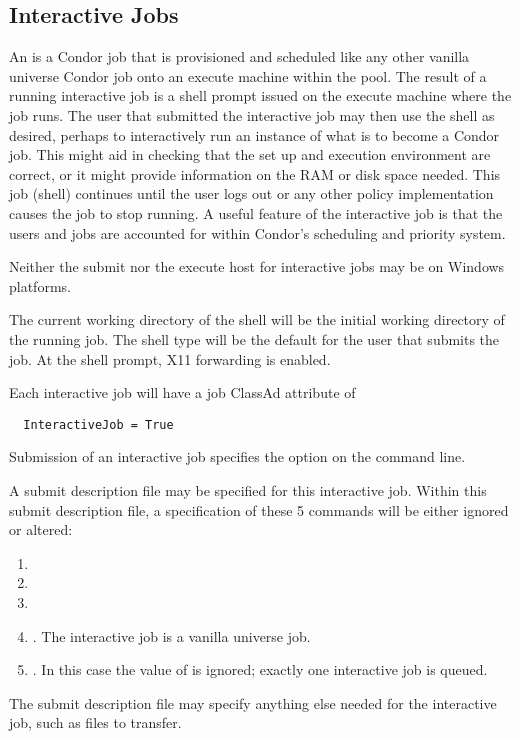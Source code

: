 \subsection{\label{sec:Submit-Interactive}Interactive Jobs}

An  is a Condor job that is provisioned and
scheduled like any other vanilla universe Condor job 
onto an execute machine within the pool.
The result of a running interactive job is a shell prompt 
issued on the execute machine where the job runs.
The user that submitted the interactive job may then use the
shell as desired,
perhaps to interactively run an instance of what is to become
a Condor job.
This might aid in checking that the set up and execution
environment are correct,
or it might provide information on the RAM or disk space needed.
This job (shell) continues until the user logs out or any other
policy implementation causes the job to stop running.
A useful feature of the interactive job is that the users and jobs
are accounted for within Condor's scheduling and priority system.

Neither the submit nor the execute host for interactive
jobs may be on Windows platforms. 

The current working directory of the shell will be the
initial working directory of the running job.
The shell type will be the default for the user that submits
the job.
At the shell prompt, X11 forwarding is enabled.

Each interactive job will have a job ClassAd attribute of 
\begin{verbatim}
  InteractiveJob = True
\end{verbatim}

Submission of an interactive job specifies the option 
on the  command line.

A submit description file may be specified for this interactive job.
Within this submit description file, 
a specification of these 5 commands will be either ignored or altered:
\begin{enumerate}
\item {}
\item {}
\item {}
\item {}.  The interactive job is a vanilla universe job. 
\item {}.  In this case the value of  is
ignored; exactly one interactive job is queued.
\end{enumerate}
The submit description file may specify anything else needed for
the interactive job, such as files to transfer.


